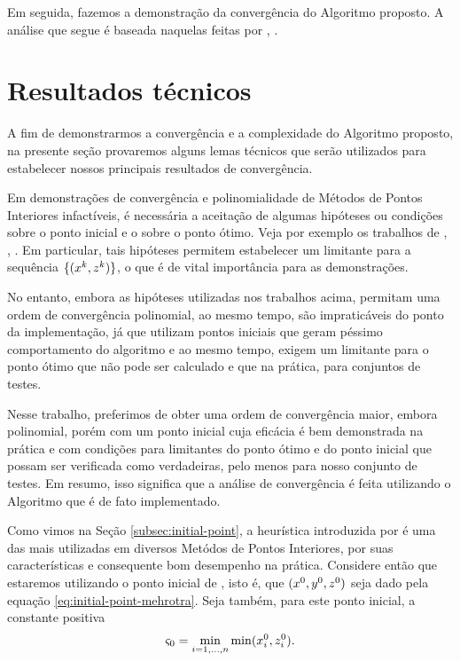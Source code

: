 Em seguida, fazemos a demonstração da convergência do Algoritmo proposto. A análise que segue é  baseada naquelas feitas por \textcite[cap. 6]{Wright:Primal-dual-interior-point:1997h},  \textcite{Zhang:2006ic,Zhang:1995fu}. 



\section{Resultados técnicos}



A fim de demonstrarmos a convergência e a complexidade do Algoritmo proposto, na presente seção provaremos alguns lemas técnicos que serão utilizados para estabelecer nossos principais resultados de convergência. 




Em demonstrações de convergência e polinomialidade de Métodos de Pontos Interiores  infactíveis, é  necessária a aceitação de algumas hipóteses ou condições sobre o ponto inicial e o sobre o ponto ótimo. Veja por exemplo os trabalhos de \textcite{Wright:1994jd}, \textcite[cap. 6]{Wright:Primal-dual-interior-point:1997h}, \textcite{Wright:1996kj,Zhang:2006ic,Zhang:1994fz,Zhang:1995fu}. Em particular, tais hipóteses permitem estabelecer um limitante para a sequência $\{(x^{k},z^{k})\}$, o que é de vital importância para as demonstrações.

No entanto, embora as hipóteses utilizadas nos trabalhos acima, permitam uma ordem de convergência  polinomial, ao mesmo tempo, são impraticáveis do ponto da implementação, já que utilizam pontos iniciais que geram péssimo comportamento do algoritmo e ao mesmo tempo, exigem um limitante para o ponto ótimo que não pode ser calculado e que na prática, para conjuntos de testes.

Nesse trabalho, preferimos de obter uma ordem de convergência maior, embora polinomial, porém com um ponto inicial cuja eficácia é bem demonstrada na prática e com  condições para limitantes  do ponto ótimo e do ponto inicial que possam ser verificada como verdadeiras, pelo menos para nosso conjunto de testes. Em resumo, isso significa que a análise de convergência é feita utilizando o Algoritmo que é de fato implementado.



Como vimos na Seção \ref{subsec:initial-point}, a heurística introduzida por \textcite{Mehrotra:1992wr} é uma das mais utilizadas em diversos Metódos de Pontos Interiores, por suas características e consequente bom desempenho na prática.
Considere então que estaremos utilizando o ponto inicial de \textcite{Mehrotra:1992wr}, isto é, que $(x^0 ,y^0,z^0 )$ seja dado pela equação \eqref{eq:initial-point-mehrotra}. Seja também, para este ponto inicial, a constante positiva
\begin{equation}
\label{eq:bdxzzero}
	\varsigma_{0}= \min_{i=1,\ldots,n}\min(x^0_{i},z^0_{i}).
\end{equation}


